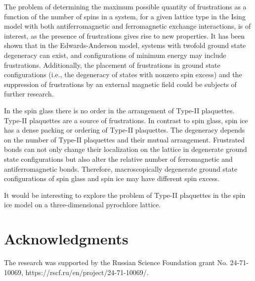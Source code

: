 \documentclass[preprint,12pt]{elsarticle}
\begin{document}
	The problem of determining the maximum possible quantity of frustrations as a function of the number of spins in a system, for a given lattice type in the Ising model with both antiferromagnetic and ferromagnetic exchange interactions, is of interest, as the presence of frustrations gives rise to new properties.
	It has been shown that in the Edwards-Anderson model, systems with twofold ground state degeneracy can exist, and configurations of minimum energy may include frustrations. Additionally, the placement of frustrations in ground state configurations (i.e., the degeneracy of states with nonzero spin excess) and the suppression of frustrations by an external magnetic field could be subjects of further research.
	
	In the spin glass there is no order in the arrangement of Type-II plaquettes.
	Type-II plaquettes are a source of frustrations.
	In contrast to spin glass, spin ice has a dense packing or ordering of Type-II plaquettes.  
	The degeneracy depends on the number of Type-II plaquettes and their mutual arrangement.
	Frustrated bonds can not only change their localization on the lattice in degenerate ground state configurations but also alter the relative number of ferromagnetic and antiferromagnetic bonds.  
	Therefore, macroscopically degenerate ground state configurations of spin glass and spin ice may have different spin excess.
	
	It would be interesting to explore the problem of Type-II plaquettes in the spin ice model on a three-dimensional pyrochlore lattice.
	
	\section{Acknowledgments}
	
	The research was supported by the Russian Science Foundation grant No. 24-71-10069, https://rscf.ru/en/project/24-71-10069/.
	
	
	
	
\end{document}

